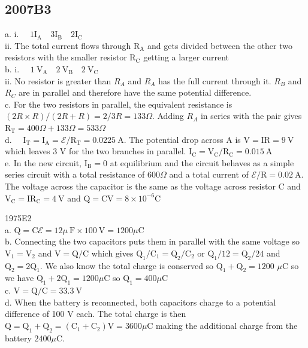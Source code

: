 \begin{enumerate}
\section*{2007B3}
a. i. $\quad 1 \mathrm{I}_{\mathrm{A}} \quad 3 \mathrm{I}_{\mathrm{B}} \quad 2 \mathrm{I}_{\mathrm{C}}$\\
ii. The total current flows through $\mathrm{R}_{\mathrm{A}}$ and gets divided between the other two resistors with the smaller resistor $\mathrm{R}_{\mathrm{C}}$ getting a larger current\\
b. i. $\quad 1 \mathrm{~V}_{\mathrm{A}} \quad 2 \mathrm{~V}_{\mathrm{B}} \quad 2 \mathrm{~V}_{\mathrm{C}}$\\
ii. No resistor is greater than $R_{A}$ and $R_{A}$ has the full current through it. $R_{B}$ and $R_{C}$ are in parallel and therefore have the same potential difference.\\
c. For the two resistors in parallel, the equivalent resistance is $(2 R \times R) /(2 R+R)=2 / 3 R=133 \Omega$. Adding $R_{A}$ in series with the pair gives $\mathrm{R}_{\mathrm{T}}=400 \Omega+133 \Omega=533 \Omega$\\
d. $\quad \mathrm{I}_{\mathrm{T}}=\mathrm{I}_{\mathrm{A}}=\boldsymbol{\mathcal { E }} / \mathrm{R}_{\mathrm{T}}=0.0225 \mathrm{~A}$. The potential drop across A is $\mathrm{V}=\mathrm{IR}=9 \mathrm{~V}$ which leaves 3 V for the two branches in parallel. $\mathrm{I}_{\mathrm{C}}=\mathrm{V}_{\mathrm{C}} / \mathrm{R}_{\mathrm{C}}=0.015 \mathrm{~A}$\\
e. In the new circuit, $\mathrm{I}_{\mathrm{B}}=0$ at equilibrium and the circuit behaves as a simple series circuit with a total resistance of $600 \Omega$ and a total current of $\boldsymbol{\mathcal { E }} / \mathrm{R}=0.02 \mathrm{~A}$. The voltage across the capacitor is the same as the voltage across resistor C and $\mathrm{V}_{\mathrm{C}}=\mathrm{IR}_{\mathrm{C}}=4 \mathrm{~V}$ and $\mathrm{Q}=\mathrm{CV}=8 \times 10^{-6} \mathrm{C}$

1975E2\\
a. $\mathrm{Q}=\mathrm{C} \boldsymbol{\mathcal { E }}=12 \mu \mathrm{~F} \times 100 \mathrm{~V}=1200 \mu \mathrm{C}$\\
b. Connecting the two capacitors puts them in parallel with the same voltage so $\mathrm{V}_{1}=\mathrm{V}_{2}$ and $\mathrm{V}=\mathrm{Q} / \mathrm{C}$ which gives $\mathrm{Q}_{1} / \mathrm{C}_{1}=\mathrm{Q}_{2} / \mathrm{C}_{2}$ or $\mathrm{Q}_{1} / 12=\mathrm{Q}_{2} / 24$ and $\mathrm{Q}_{2}=2 \mathrm{Q}_{1}$. We also know the total charge is conserved so $\mathrm{Q}_{1}+\mathrm{Q}_{2}=1200$ $\mu \mathrm{C}$ so we have $\mathrm{Q}_{1}+2 \mathrm{Q}_{1}=1200 \mu \mathrm{C}$ so $\mathrm{Q}_{1}=400 \mu \mathrm{C}$\\
c. $\mathrm{V}=\mathrm{Q} / \mathrm{C}=33.3 \mathrm{~V}$\\
d. When the battery is reconnected, both capacitors charge to a potential difference of 100 V each. The total charge is then $\mathrm{Q}=\mathrm{Q}_{1}+\mathrm{Q}_{2}=\left(\mathrm{C}_{1}+\mathrm{C}_{2}\right) \mathrm{V}=3600 \mu \mathrm{C}$ making the additional charge from the battery $2400 \mu \mathrm{C}$.


\end{enumerate}
